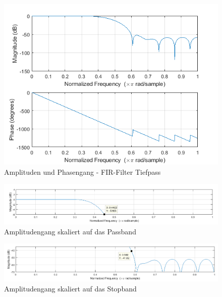 





\begin{figure}[H]
\centering
\includegraphics[width=1.0\linewidth]{Bilder/Attachment_A1_fir_2a_Amplitudengang}
\caption{Amplituden und Phasengang - FIR-Filter Tiefpass}
\label{fig:Attachment_A1_fir_2a_Amplitudengang}
\end{figure}


\begin{figure}[H]
\centering
\includegraphics[width=1.0\linewidth]{Bilder/Attachment_A1_fir_2a_Amplitudengang_PassBand}
\caption{Amplitudengang skaliert auf das Passband}
\label{fig:Attachment_A1_fir_2a_Amplitudengang_PassBand}
\end{figure}



\begin{figure}[H]
\centering
\includegraphics[width=1.0\linewidth]{Bilder/Attachment_A1_fir_2a_Amplitudengang_StopBand}
\caption{Amplitudengang skaliert auf das Stopband}
\label{fig:Attachment_A1_fir_2a_Amplitudengang_StopBand}
\end{figure}

